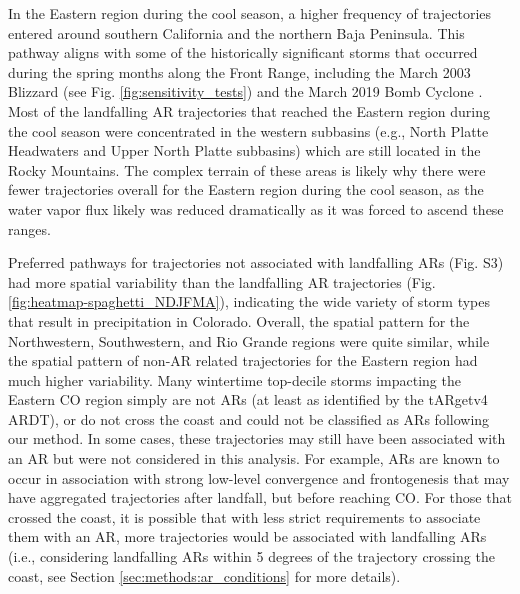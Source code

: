 \documentclass[draft]{agujournal2019}
\begin{document}

In the Eastern region during the cool season, a higher frequency of trajectories entered around southern California and the northern Baja Peninsula. This pathway aligns with some of the historically significant storms that occurred during the spring months along the Front Range, including the March 2003 Blizzard (see Fig. \ref{fig:sensitivity_tests}) and the March 2019 Bomb Cyclone \cite{Zou2025A2019}. Most of the landfalling AR trajectories that reached the Eastern region during the cool season were concentrated in the western subbasins (e.g., North Platte Headwaters and Upper North Platte subbasins) which are still located in the Rocky Mountains. The complex terrain of these areas is likely why there were fewer trajectories overall for the Eastern region during the cool season, as the water vapor flux likely was reduced dramatically as it was forced to ascend these ranges.  

Preferred pathways for trajectories not associated with landfalling ARs (Fig. S3) had more spatial variability than the landfalling AR trajectories (Fig. \ref{fig:heatmap-spaghetti_NDJFMA}), indicating the wide variety of storm types that result in precipitation in Colorado. Overall, the spatial pattern for the Northwestern, Southwestern, and Rio Grande regions were quite similar, while the spatial pattern of non-AR related trajectories for the Eastern region had much higher variability. Many wintertime top-decile storms impacting the Eastern CO region simply are not ARs (at least as identified by the tARgetv4 ARDT), or do not cross the coast and could not be classified as ARs following our method. In some cases, these trajectories may still have been associated with an AR but were not considered in this analysis. For example, ARs are known to occur in association with strong low-level convergence and frontogenesis \cite{Cordeira2013} that may have aggregated trajectories after landfall, but before reaching CO. For those that crossed the coast, it is possible that with less strict requirements to associate them with an AR, more trajectories would be associated with landfalling ARs (i.e., considering landfalling ARs within 5 degrees of the trajectory crossing the coast, see Section \ref{sec:methods:ar_conditions} for more details).
\end{document}
